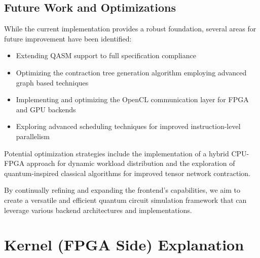 \documentclass[12pt,oneside,a4paper]{article}
\begin{document}

\subsection{Future Work and Optimizations}

While the current implementation provides a robust foundation, several areas for future improvement have been identified:

\begin{itemize}
    \item Extending QASM support to full specification compliance
    \item Optimizing the contraction tree generation algorithm employing advanced graph based techniques \cite{PhysRevE.90.033315}
    \item Implementing and optimizing the OpenCL communication layer for FPGA and GPU backends
    \item Exploring advanced scheduling techniques for improved instruction-level parallelism
\end{itemize}

Potential optimization strategies include the implementation of a hybrid CPU-FPGA approach for dynamic workload distribution and the exploration of quantum-inspired classical algorithms for improved tensor network contraction.

By continually refining and expanding the frontend's capabilities, we aim to create a versatile and efficient quantum circuit simulation framework that can leverage various backend architectures and implementations.



\section{Kernel (FPGA Side) Explanation}


\end{document}
